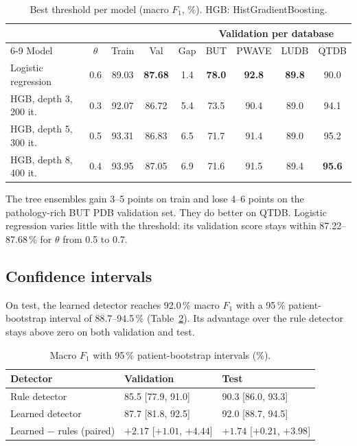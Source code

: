 \documentclass[11pt,a4paper]{article}
\begin{document}
\begin{table}[htbp]
\centering\small
\caption{Best threshold per model (macro $F_1$, \%). HGB: HistGradientBoosting.}
\label{tab:models}
\setlength{\tabcolsep}{4.5pt}
\begin{tabular}{lcccccccc}
\toprule
& & & & & \multicolumn{4}{c}{Validation per database} \\
\cmidrule(l){6-9}
Model & $\theta$ & Train & Val & Gap & BUT & PWAVE & LUDB & QTDB \\
\midrule
Logistic regression & 0.6 & 89.03 & \textbf{87.68} & 1.4 & \textbf{78.0} & \textbf{92.8} & \textbf{89.8} & 90.0 \\
HGB, depth 3, 200 it. & 0.3 & 92.07 & 86.72 & 5.4 & 73.5 & 90.4 & 89.0 & 94.1 \\
HGB, depth 5, 300 it. & 0.5 & 93.31 & 86.83 & 6.5 & 71.7 & 91.4 & 89.0 & 95.2 \\
HGB, depth 8, 400 it. & 0.4 & 93.95 & 87.05 & 6.9 & 71.6 & 91.5 & 89.4 & \textbf{95.6} \\
\bottomrule
\end{tabular}
\end{table}

The tree ensembles gain 3--5 points on train and lose 4--6 points on the pathology-rich BUT PDB validation set. They do better on QTDB. Logistic regression varies little with the threshold: its validation score stays within 87.22--87.68\,\% for $\theta$ from 0.5 to 0.7.

\subsection{Confidence intervals}
\label{sec:ci}

On test, the learned detector reaches 92.0\,\% macro $F_1$ with a 95\,\% patient-bootstrap interval of 88.7--94.5\,\% (Table~\ref{tab:ci}). Its advantage over the rule detector stays above zero on both validation and test.

\begin{table}[htbp]
\centering\small
\caption{Macro $F_1$ with 95\,\% patient-bootstrap intervals (\%).}
\label{tab:ci}
\begin{tabular}{lll}
\toprule
Detector & Validation & Test \\
\midrule
Rule detector & 85.5 [77.9, 91.0] & 90.3 [86.0, 93.3] \\
Learned detector & 87.7 [81.8, 92.5] & 92.0 [88.7, 94.5] \\
\midrule
Learned $-$ rules (paired) & $+2.17$ [$+1.01$, $+4.44$] & $+1.74$ [$+0.21$, $+3.98$] \\
\bottomrule
\end{tabular}
\end{table}
\end{document}
